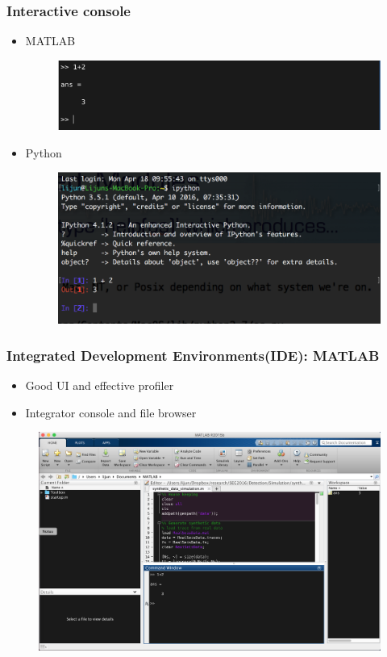 \documentclass[compress]{beamer}
\begin{document}
\begin{frame}
	\frametitle{Interactive console}
	\begin{itemize}
		\item MATLAB
		\begin{figure}
			\centering
			\includegraphics[width=\linewidth]{fig/matlab_console}
		\end{figure}
		\item Python
				\begin{figure}
			\centering
			\includegraphics[width=\linewidth]{fig/ipython}
		\end{figure}
	\end{itemize}
\end{frame}

\begin{frame}
	\frametitle{Integrated Development Environments(IDE): MATLAB}
	\begin{itemize}
		\item Good UI and effective profiler
		\item Integrator console and file browser
	\end{itemize}
	\begin{figure}
		\centering
		\includegraphics[width=\textwidth]{fig/matlabIDE}
	\end{figure}
\end{frame}
\end{document}

